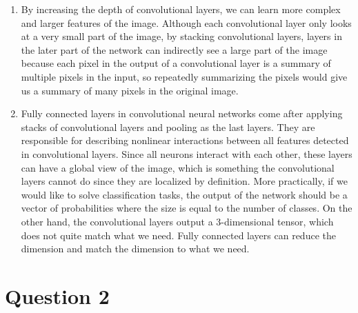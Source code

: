 \documentclass[
	12pt, %
]{../Template/fphw}
\begin{document}
\begin{enumerate}[label=(\arabic*)]
    \item By increasing the depth of convolutional layers, we can learn more complex and larger features of the image. Although each convolutional layer only looks at a very small part of the image, by stacking convolutional layers, layers in the later part of the network can indirectly see a large part of the image because each pixel in the output of a convolutional layer is a summary of multiple pixels in the input, so repeatedly summarizing the pixels would give us a summary of many pixels in the original image.

    \item Fully connected layers in convolutional neural networks come after applying stacks of convolutional layers and pooling as the last layers. They are responsible for describing nonlinear interactions between all features detected in convolutional layers. Since all neurons interact with each other, these layers can have a global view of the image, which is something the convolutional layers cannot do since they are localized by definition. More practically, if we would like to solve classification tasks, the output of the network should be a vector of probabilities where the size is equal to the number of classes. On the other hand, the convolutional layers output a 3-dimensional tensor, which does not quite match what we need. Fully connected layers can reduce the dimension and match the dimension to what we need.
\end{enumerate}
 

\section*{Question 2}
\end{document}
